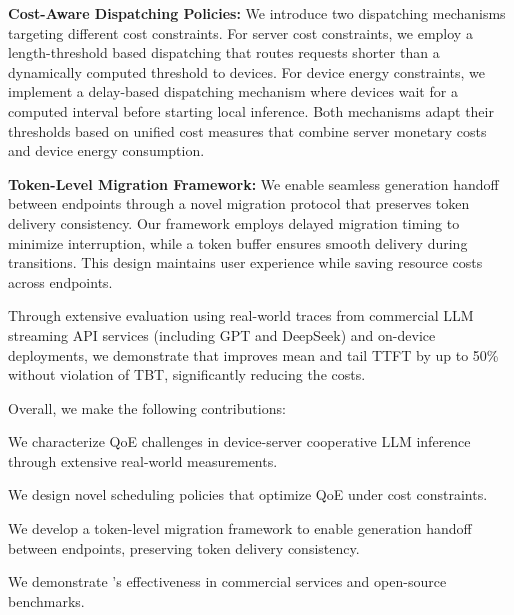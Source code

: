 \begin{denseitemize}
   \item \textbf{Cost-Aware Dispatching Policies:} 
   We introduce two dispatching mechanisms targeting different cost constraints. For server cost constraints, we employ a length-threshold based dispatching that routes requests shorter than a dynamically computed threshold to devices. For device energy constraints, we implement a delay-based dispatching mechanism where devices wait for a computed interval before starting local inference. Both mechanisms adapt their thresholds based on unified cost measures that combine server monetary costs and device energy consumption. 

   \item \textbf{Token-Level Migration Framework:} 
   We enable seamless generation handoff between endpoints through a novel migration protocol that preserves token delivery consistency. Our framework employs delayed migration timing to minimize interruption, while a token buffer ensures smooth delivery during transitions. This design maintains user experience while saving resource costs across endpoints.
\end{denseitemize}

Through extensive evaluation using real-world traces from commercial LLM streaming API services (including GPT and DeepSeek) and on-device deployments, we demonstrate that \disco{} improves mean and tail TTFT by up to 50\% without violation of TBT, significantly reducing the costs.

Overall, we make the following contributions:
\begin{denseitemize}
   \item We characterize QoE challenges in device-server cooperative LLM inference through extensive real-world measurements. 
   
   \item We design novel scheduling policies that optimize QoE under cost constraints. 
   
   \item We develop a token-level migration framework to enable generation handoff between endpoints, preserving token delivery consistency.
   
   \item We demonstrate \disco{}'s effectiveness in commercial services and open-source benchmarks.
\end{denseitemize}
